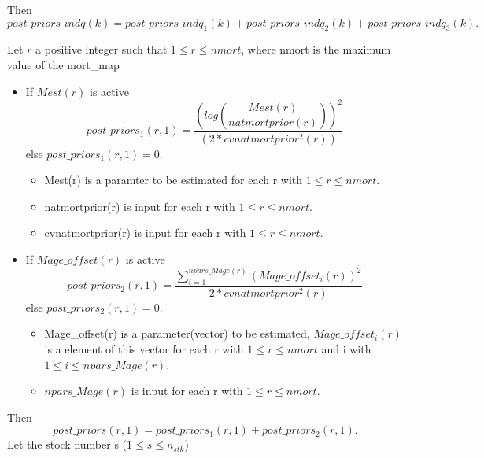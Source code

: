 \documentclass{article}
\begin{document}
    Then 
    \begin{equation}
         post\_priors\_indq(k)=post\_priors\_indq_1(k)+post\_priors\_indq_2(k)+ post\_priors\_indq_3(k).
    \end{equation}

    
    Let $r$ a positive integer such that $1\leq r \leq nmort$, where nmort is the maximum value of the mort\_map
    \begin{itemize}
        \item If $Mest(r)$ is active
        \begin{equation}
            post\_priors_1(r,1) = \dfrac{\left(log\left(\dfrac{Mest(r)}{natmortprior(r)}\right)\right)^2}{(2*cvnatmortprior^2(r))}
\end{equation}
        else $post\_priors_1(r,1)=0$.
    \begin{itemize}
        \item Mest(r) is a paramter to be estimated for each r with $1\leq r \leq nmort$.
        \item natmortprior(r) is input for each r with $1\leq r \leq nmort$.
        
        \item cvnatmortprior(r) is input for each r with $1\leq r \leq nmort$.
    \end{itemize}

        
\item If $Mage\_offset(r)$ is active
        \begin{equation}
            post\_priors_2(r,1) = \dfrac{\displaystyle\sum_{i=1}^{npars\_Mage(r)}(Mage\_offset_i(r))^2}{2*cvnatmortprior^2(r)}
        \end{equation}
        else $post\_priors_2(r,1)=0$.
        \begin{itemize}
        \item Mage\_offset(r) is a parameter(vector) to be estimated, $Mage\_offset_i(r)$  is a element of this vector for each r with $1\leq r \leq nmort$ and i with $1\leq i \leq npars\_Mage(r)$.
        \item $npars\_Mage(r)$ is input for each r with $1\leq r \leq nmort$.
        \end{itemize}
    \end{itemize}
    Then
        \begin{equation}
            post\_priors(r,1)=post\_priors_1(r,1)+post\_priors_2(r,1).
        \end{equation}
    Let the stock number s ($1\leq s \leq n_{stk}$)
\end{document}
